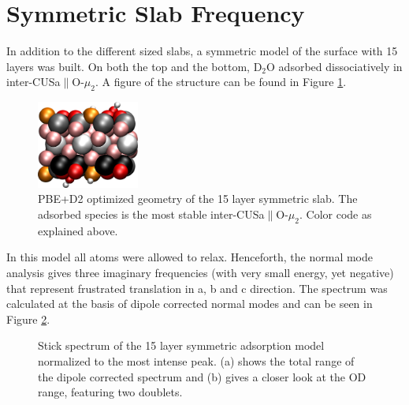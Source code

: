 \documentclass[11pt,DIV=13,BCOR=5mm,a4paper,headinclude]{scrbook}
\begin{document}
\section{Symmetric Slab Frequency}\label{symmetric_slab}
In addition to the different sized slabs, a symmetric model of the surface with 15 layers was built.
On both the top and the bottom, D$_2$O adsorbed dissociatively in inter-CUSa$\parallel$O-$\mu_2$.
A figure of the structure can be found in Figure \ref{abb:symm-slab}.
 \begin{figure} [!h]
 \centering
 \includegraphics[width=0.3\textwidth]{figures/11-20/side_symmcell_iCa2.png}
  \caption{PBE+D2 optimized geometry of the 15 layer symmetric slab.
The adsorbed species is the most stable inter-CUSa$\parallel$O-$\mu_2$.
Color code as explained above.} 
        \label{abb:symm-slab}
 \end{figure}
 In this model all atoms were allowed to relax.
Henceforth, the normal mode analysis gives three imaginary frequencies (with very small energy, yet negative) that represent frustrated translation in a, b and c direction.
The spectrum was calculated at the basis of dipole corrected normal modes and can be seen in Figure \ref{abb:symm-iCa2_spec}.
 \begin{figure}[!h]
    \centering
             \quad
             \caption{Stick spectrum of the 15 layer symmetric adsorption model normalized to the most intense peak.
(a) shows the total range of the dipole corrected spectrum and (b) gives a closer look at the OD range, featuring two doublets.}
            \label{abb:symm-iCa2_spec}
     \end{figure}
\end{document}
